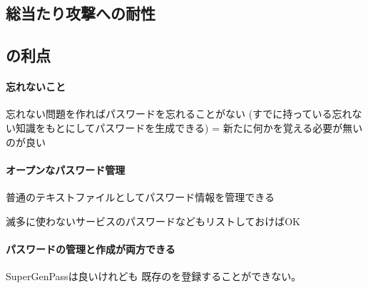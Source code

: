 \documentclass[twoside]{wiss}
\begin{document}


\subsection{総当たり攻撃への耐性}

\subsection{{\EP}の利点}

\paragraph{忘れないこと}

忘れない問題を作ればパスワードを忘れることがない
(すでに持っている忘れない知識をもとにしてパスワードを生成できる)
 = 新たに何かを覚える必要が無いのが良い

\paragraph{オープンなパスワード管理}

普通のテキストファイルとしてパスワード情報を管理できる

滅多に使わないサービスのパスワードなどもリストしておけばOK

\paragraph{パスワードの管理と作成が両方できる}

SuperGenPass\cite{SuperGenPass}は良いけれども
既存の{\PW}を登録することができない。
\end{document}
